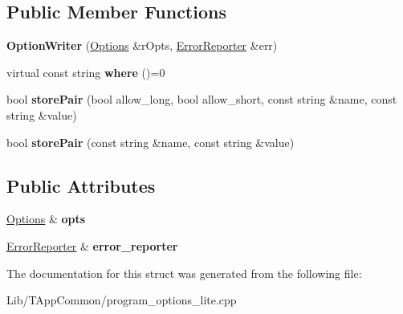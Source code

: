\subsection*{Public Member Functions}
\begin{DoxyCompactItemize}
\item 
\mbox{\label{structdf_1_1program__options__lite_1_1_option_writer_a26aca61b018a91a67880379205f1a3bf}} 
{\bfseries Option\+Writer} (\hyperlink{structdf_1_1program__options__lite_1_1_options}{Options} \&r\+Opts, \hyperlink{structdf_1_1program__options__lite_1_1_error_reporter}{Error\+Reporter} \&err)
\item 
\mbox{\label{structdf_1_1program__options__lite_1_1_option_writer_a7275abf255aa1227579e9f194639ec77}} 
virtual const string {\bfseries where} ()=0
\item 
\mbox{\label{structdf_1_1program__options__lite_1_1_option_writer_a7661035ecdccd15503e6d1a88ec78d50}} 
bool {\bfseries store\+Pair} (bool allow\+\_\+long, bool allow\+\_\+short, const string \&name, const string \&value)
\item 
\mbox{\label{structdf_1_1program__options__lite_1_1_option_writer_a024de1064034bc9585c1477fa3dc1e73}} 
bool {\bfseries store\+Pair} (const string \&name, const string \&value)
\end{DoxyCompactItemize}
\subsection*{Public Attributes}
\begin{DoxyCompactItemize}
\item 
\mbox{\label{structdf_1_1program__options__lite_1_1_option_writer_afc19de93afdfd2848bc56e050bcc6595}} 
\hyperlink{structdf_1_1program__options__lite_1_1_options}{Options} \& {\bfseries opts}
\item 
\mbox{\label{structdf_1_1program__options__lite_1_1_option_writer_a990c25cd507460cfce1e81ef25ec367e}} 
\hyperlink{structdf_1_1program__options__lite_1_1_error_reporter}{Error\+Reporter} \& {\bfseries error\+\_\+reporter}
\end{DoxyCompactItemize}


The documentation for this struct was generated from the following file\+:\begin{DoxyCompactItemize}
\item 
Lib/\+T\+App\+Common/program\+\_\+options\+\_\+lite.\+cpp\end{DoxyCompactItemize}
